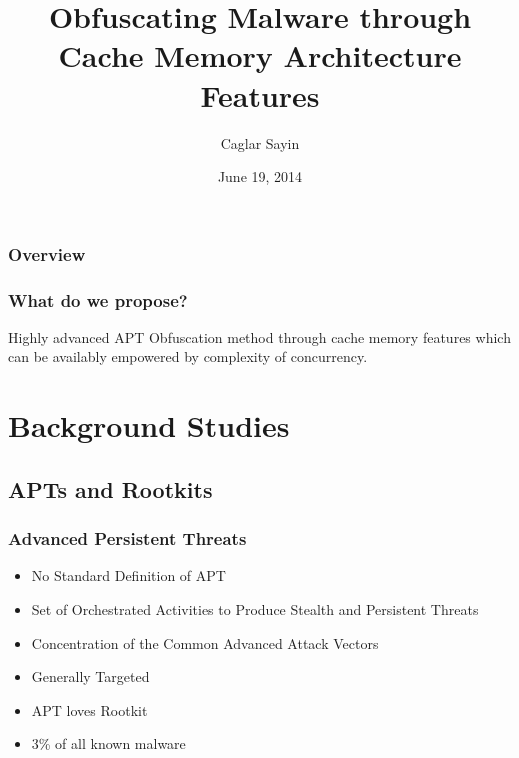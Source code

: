 \documentclass{beamer}
\title[Cache Oriented Obfuscation]{Obfuscating Malware through Cache Memory Architecture Features} %
\author{Caglar Sayin} %
\institute[HIG] %
{
Gjovik University \\ %
\medskip
\textit{me@caglarsay.in} %
}
\date{June 19, 2014} %
\begin{document}
\begin{frame}
\titlepage %
\end{frame}


\begin{frame}
\frametitle{Overview} %
\setcounter{tocdepth}{1}

\tableofcontents %
\end{frame}


\begin{frame}
	\frametitle{What do we propose?}
	\Large
	Highly advanced APT Obfuscation method through cache memory features which can be availably empowered by complexity of concurrency.
\end{frame}

\section{Background Studies} 
\subsection{APTs and Rootkits} 

\begin{frame}
	\frametitle{Advanced Persistent Threats}
	\begin{itemize}
		\item No Standard Definition of APT
		\item Set of Orchestrated Activities to Produce Stealth and Persistent Threats
		\item Concentration of the Common Advanced Attack Vectors
		\item Generally Targeted
		\item APT loves Rootkit
		\item 3\% of all known malware 
	\end{itemize}
\end{frame}
\end{document}
